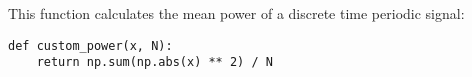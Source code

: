 
\item[(d)]
This function calculates the mean power of a discrete time periodic signal:

\begin{verbatim}
def custom_power(x, N):
    return np.sum(np.abs(x) ** 2) / N
\end{verbatim}
